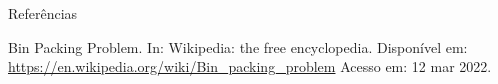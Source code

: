 \documentclass{article}
\begin{document}
\begin{section}{Referências}

Bin Packing Problem. In: Wikipedia: the free encyclopedia. Disponível em: \url{https://en.wikipedia.org/wiki/Bin_packing_problem} Acesso em: 12 mar 2022. 

\end{section}
\end{document}
